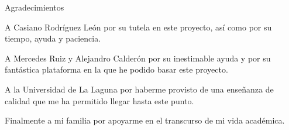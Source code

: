 \newpage
\thispagestyle{empty}

{ \flushright

\begin{LARGE}
Agradecimientos
\end{LARGE}

\hspace{3mm}

\begin{large}
A Casiano Rodríguez León por su tutela en este proyecto, así como por su tiempo, ayuda y paciencia.

A Mercedes Ruiz y Alejandro Calderón por su inestimable ayuda y por su fantástica plataforma en la que he podido basar este proyecto.

A la Universidad de La Laguna por haberme provisto de una enseñanza de calidad que me ha permitido llegar hasta este punto.

Finalmente a mi familia por apoyarme en el transcurso de mi vida académica.
\end{large}

}
